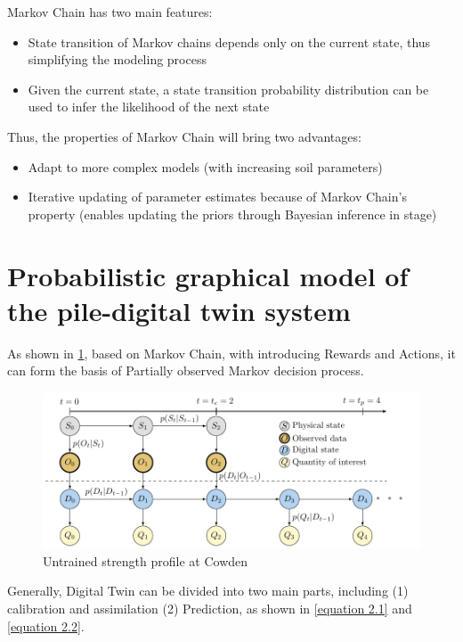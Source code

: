   Markov Chain has two main features:
  \begin{itemize}
      \item State transition of Markov chains depends only on the current state, thus simplifying the modeling process
      \item Given the current state, a state transition probability distribution can be used to infer the likelihood of the next state

  \end{itemize}

  Thus, the properties of Markov Chain will bring two advantages: 

  \begin{itemize}
      \item Adapt to more complex models (with increasing soil parameters)
      \item Iterative updating of parameter estimates because of Markov Chain’s property (enables  updating the priors through Bayesian inference in stage)

  \end{itemize}


  \section{Probabilistic graphical model of the
pile-digital twin system}

As shown in \cref{fig:fig2.2}, based on Markov Chain, with introducing Rewards and Actions, it can form the basis of Partially observed Markov decision process.


\begin{figure}[htbp]
    \centering
    \includegraphics[width = 150mm]{Figures/figure3.pdf}
    \caption{Untrained strength profile at Cowden \protect\cite{kapteyn2021}}
    \label{fig:fig2.2}
\end{figure}



Generally, Digital Twin can be divided into two main parts, including (1) calibration and assimilation (2) Prediction, as shown in \cref{equation 2.1}  and \cref{equation 2.2}.

